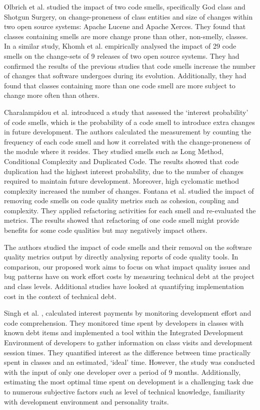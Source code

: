 \documentclass{mpaper}
\begin{document}
Olbrich et al. \cite{Olbrich2009} studied the impact of two code smells,
specifically God class and Shotgun Surgery, on change-proneness of class
entities and size of changes within two open source systems: Apache Lucene and
Apache Xerces. They found that classes containing smells are more change prone
than other, non-smelly, classes. In a similar study, Khomh et al.
\cite{Khomh2009} empirically analysed the impact of 29 code smells on the
change-sets of 9 releases of two open source systems. They had confirmed the
results of the previous studies that code smells increase the number of changes
that software undergoes during its evolution. Additionally, they had found that
classes containing more than one code smell are more subject to change more
often than others. 

Charalampidou et al. \cite{Charalampidou2017} introduced a study that assessed
the `interest probability' of code smells, which is the probability of a code
smell to introduce extra changes in future development. The authors calculated
the measurement by counting the frequency of each code smell and how it
correlated with the change-proneness of the module where it resides. They
studied smells such as Long Method, Conditional Complexity and Duplicated Code.
The results showed that code duplication had the highest interest probability,
due to the number of changes required to maintain future development. Moreover,
high cyclomatic method complexity increased the number of changes. Fontana et
al. \cite{Fontana2012} studied the impact of removing code smells on code
quality metrics such as cohesion, coupling and complexity. They applied
refactoring activities for each smell and re-evaluated the metrics. The results
showed that refactoring of one code smell might provide benefits for some code
qualities but may negatively impact others.

The authors studied the impact of code smells and their removal on the software
quality metrics output by directly analysing reports of code quality tools. In
comparison, our proposed work aims to focus on what impact quality issues and
bug patterns have on work effort costs by measuring technical debt at the
project and class levels. Additional studies have looked at quantifying
implementation cost in the context of technical debt.

Singh et al. \cite{Singh2014}, calculated interest payments by monitoring
development effort and code comprehension. They monitored time spent by
developers in classes with known debt items and implemented a tool within the
Integrated Development Environment of developers to gather information on class
visits and development session times. They quantified interest as the difference
between time practically spent in classes and an estimated, `ideal' time.
However, the study was conducted with the input of only one developer over a
period of 9 months. Additionally, estimating the most optimal time spent on
development is a challenging task due to numerous subjective factors such as
level of technical knowledge, familiarity with development environment and
personality traits.
\end{document}
